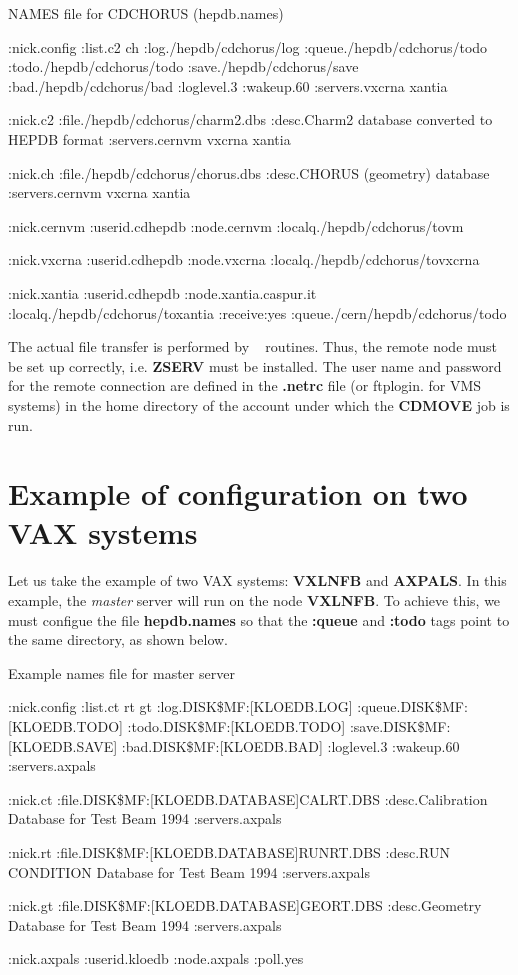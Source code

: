 \begin{XMPt}{NAMES file for CDCHORUS (hepdb.names) }

:nick.config
   :list.c2 ch
   :log./hepdb/cdchorus/log
   :queue./hepdb/cdchorus/todo
   :todo./hepdb/cdchorus/todo
   :save./hepdb/cdchorus/save
   :bad./hepdb/cdchorus/bad
   :loglevel.3
   :wakeup.60
   :servers.vxcrna xantia

:nick.c2
   :file./hepdb/cdchorus/charm2.dbs
   :desc.Charm2 database converted to HEPDB format
   :servers.cernvm vxcrna xantia

:nick.ch
   :file./hepdb/cdchorus/chorus.dbs
   :desc.CHORUS (geometry) database
   :servers.cernvm vxcrna xantia

:nick.cernvm
   :userid.cdhepdb
   :node.cernvm
   :localq./hepdb/cdchorus/tovm

:nick.vxcrna
   :userid.cdhepdb
   :node.vxcrna
   :localq./hepdb/cdchorus/tovxcrna

:nick.xantia
   :userid.cdhepdb
   :node.xantia.caspur.it
   :localq./hepdb/cdchorus/toxantia
   :receive:yes
   :queue./cern/hepdb/cdchorus/todo
\end{XMPt}

The actual file transfer is performed by \CSPACK{}~\cite{bib-CSPACK}
routines. Thus, the remote node must be set up correctly, i.e.
{\bf ZSERV} must be installed. The user name and password for
the remote connection are defined in the {\bf .netrc} file
(or ftplogin. for VMS systems) 
in the home directory of the account under which the
{\bf CDMOVE} job is run.

\section{Example of configuration on two VAX systems}

Let us take the example of two VAX systems: {\bf VXLNFB}
and {\bf AXPALS}. In this example, the {\it master} server
will run on the node {\bf VXLNFB}. To achieve this, we
must configue the file {\bf hepdb.names} so that the
{\bf :queue} and {\bf :todo} tags point to the same directory,
as shown below.

\begin{XMPt}{Example names file for master server}

:nick.config
:list.ct rt gt
:log.DISK\$MF:[KLOEDB.LOG]
:queue.DISK\$MF:[KLOEDB.TODO]
:todo.DISK\$MF:[KLOEDB.TODO]
:save.DISK\$MF:[KLOEDB.SAVE]
:bad.DISK\$MF:[KLOEDB.BAD]
:loglevel.3
:wakeup.60
:servers.axpals

:nick.ct
:file.DISK\$MF:[KLOEDB.DATABASE]CALRT.DBS
:desc.Calibration Database for Test Beam 1994
:servers.axpals

:nick.rt
:file.DISK\$MF:[KLOEDB.DATABASE]RUNRT.DBS
:desc.RUN CONDITION Database for Test Beam 1994
:servers.axpals

:nick.gt
:file.DISK\$MF:[KLOEDB.DATABASE]GEORT.DBS
:desc.Geometry Database for Test Beam 1994
:servers.axpals

:nick.axpals
:userid.kloedb
:node.axpals
:poll.yes

\end{XMPt}

